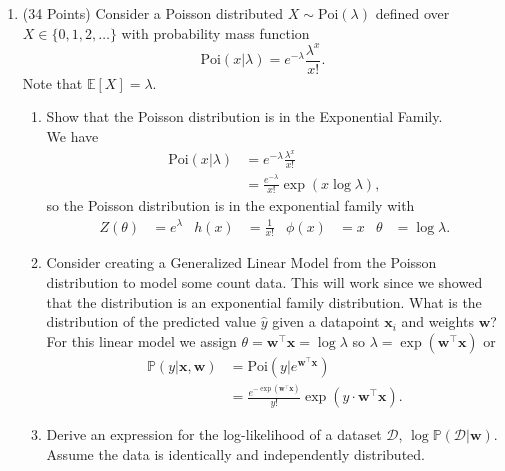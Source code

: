 \documentclass[letter, 12pt]{article}
\begin{document}
\begin{enumerate}
\begin{enumerate}
    \end{enumerate}
    \clearpage
\item (34 Points) Consider a Poisson distributed $X\sim \mathrm{Poi}(\lambda)$ defined
    over $X\in\{0,1,2,\dots\}$ with probability mass function
    \[
        \mathrm{Poi}(x|\lambda) = e^{-\lambda}\frac{\lambda^x}{x!}.
    \]
    Note that $\mathbb{E}[X] = \lambda$.
    \begin{enumerate}
        \item Show that the Poisson distribution is in the Exponential Family.\\[1em]
            We have
            \begin{align*}
                \mathrm{Poi}(x|\lambda) &= e^{-\lambda}\frac{\lambda^x}{x!}\\
                &= \frac{e^{-\lambda}}{x!}\exp\left(x\log\lambda\right),
            \end{align*}
            so the Poisson distribution is in the exponential family with
            \begin{align*}
                Z(\theta) &= e^{\lambda} & h(x) &= \frac{1}{x!} & \phi(x) &= x & \theta &= \log\lambda.
            \end{align*}
            \vfill\vfill
        \item Consider creating a Generalized Linear Model from the Poisson distribution
            to model some count data. This will work since we showed that the distribution
            is an exponential family distribution. What is the distribution of the
            predicted value $\hat y$ given a datapoint $\mathbf{x}_i$ and weights
            $\mathbf{w}$?\\[1em]
            For this linear model we assign $\theta = \mathbf{w}^\top\mathbf{x} = \log\lambda$
            so $\lambda = \exp\left(\mathbf{w}^\top\mathbf{x}\right)$ or
            \begin{align*}
                \mathbb{P}(y|\mathbf{x},\mathbf{w}) &= \mathrm{Poi}\left(y|e^{\mathbf{w}^\top\mathbf{x}}\right)\\
                &= \frac{e^{-\exp(\mathbf{w}^\top\mathbf{x})}}{y!}\exp\left(y\cdot\mathbf{w}^\top\mathbf{x}\right).
            \end{align*}
            \vfill\clearpage
        \item Derive an expression for the log-likelihood of a dataset $\mathcal{D}$,
            $\log\mathbb{P}(\mathcal{D}|\mathbf{w})$. Assume the data is identically and
            independently distributed.\\[1em]

\end{enumerate}
\end{enumerate}
\end{document}
